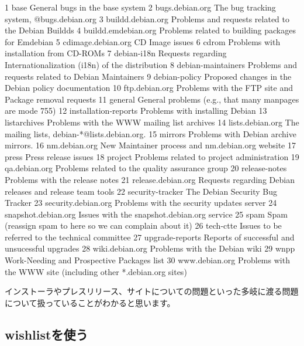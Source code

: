 \documentclass[mingoth,a4paper]{jsarticle}
\begin{document}
\begin{commandline}
 1 base                  General bugs in the base system
 2 bugs.debian.org       The bug tracking system, @bugs.debian.org
 3 buildd.debian.org     Problems and requests related to the Debian Buildds
 4 buildd.emdebian.org   Problems related to building packages for Emdebian
 5 cdimage.debian.org    CD Image issues
 6 cdrom                 Problems with installation from CD-ROMs
 7 debian-i18n           Requests regarding Internationalization (i18n) of the
                         distribution
 8 debian-maintainers    Problems and requests related to Debian Maintainers
 9 debian-policy         Proposed changes in the Debian policy documentation
10 ftp.debian.org        Problems with the FTP site and Package removal
                         requests
11 general               General problems (e.g., that many manpages are mode
                         755)
12 installation-reports  Problems with installing Debian
13 listarchives          Problems with the WWW mailing list archives
14 lists.debian.org      The mailing lists, debian-*@lists.debian.org.
15 mirrors               Problems with Debian archive mirrors.
16 nm.debian.org         New Maintainer process and nm.debian.org website
17 press                 Press release issues
18 project               Problems related to project administration
19 qa.debian.org         Problems related to the quality assurance group
20 release-notes         Problems with the release notes
21 release.debian.org    Requests regarding Debian releases and release team
                         tools
22 security-tracker      The Debian Security Bug Tracker
23 security.debian.org   Problems with the security updates server
24 snapshot.debian.org   Issues with the snapshot.debian.org service
25 spam                  Spam (reassign spam to here so we can complain about
                         it)
26 tech-ctte             Issues to be referred to the technical committee
27 upgrade-reports       Reports of successful and unsucessful upgrades
28 wiki.debian.org       Problems with the Debian wiki
29 wnpp                  Work-Needing and Prospective Packages list
30 www.debian.org        Problems with the WWW site (including other
                         *.debian.org sites)
\end{commandline}

インストーラやプレスリリース、サイトについての問題といった多岐に渡る問題
について扱っていることがわかると思います。

\subsection{wishlistを使う}
\end{document}

